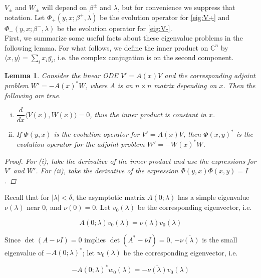 \documentclass[12pt]{article}
\def\C{{\mathbb C}}
\newtheorem{lemma}{Lemma}
\begin{document}
$V_\pm$ and $W_\pm$ will depend on $\beta^\pm$ and $\lambda$, but for convenience we suppress that notation. Let $\Phi_+(y, x; \beta^+, \lambda)$ be the evolution operator for \eqref{eig:V+} and $\Phi_-(y, x; \beta^-, \lambda)$ be the evolution operator for \eqref{eig:V-}.\\

First, we summarize some useful facts about these eigenvalue problems in the following lemma. For what follows, we define the inner product on $\C^n$ by $\langle x, y \rangle = \sum_i x_i \bar{y_i}$, i.e. the complex conjugation is on the second component.


\begin{lemma}\label{eigadjoint}
Consider the linear ODE $V' = A(x)V$ and the corresponding adjoint problem $W' = -A(x)^* W$, where $A$ is an $n \times n$ matrix depending on $x$. Then the following are true.
\begin{enumerate}[(i)]
\item $\dfrac{d}{dx}\langle V(x), W(x) \rangle = 0$, thus the inner product is constant in $x$.
\item If $\Phi(y, x)$ is the evolution operator for $V' = A(x)V$, then $\Phi(x, y)^*$ is the evolution operator for the adjoint problem $W' = -W(x)^* W$.
\end{enumerate}
\begin{proof}
For (i), take the derivative of the inner product and use the expressions for $V'$ and $W'$. For (ii), take the derivative of the expression $\Phi(y, x)\Phi(x, y) = I$.
\end{proof}
\end{lemma}

Recall that for $|\lambda| < \delta$, the asymptotic matrix $A(0; \lambda)$ has a simple eigenvalue $\nu(\lambda)$ near 0, and $\nu(0) = 0$. Let $v_0(\lambda)$ be the corresponding eigenvector, i.e.

\begin{equation}\label{defv0}
A(0; \lambda) v_0(\lambda) = \nu(\lambda) v_0(\lambda)
\end{equation}

Since $\det(A - \nu I) = 0$ implies $\det(A^* - \overline{\nu}I) = 0$, $-\overline{\nu(\lambda)}$ is the small eigenvalue of $-A(0; \lambda)^*$; let $w_0(\lambda)$ be the corresponding eigenvector, i.e.

\begin{equation}\label{defw0}
-A(0; \lambda)^* w_0(\lambda) = -\overline{\nu(\lambda)} v_0(\lambda)
\end{equation}
\end{document}
